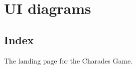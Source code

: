 \chapter{UI diagrams}

\section{Index}
\begin{figure}[h!]
\end{figure}

The landing page for the Charades Game.

\newpage

